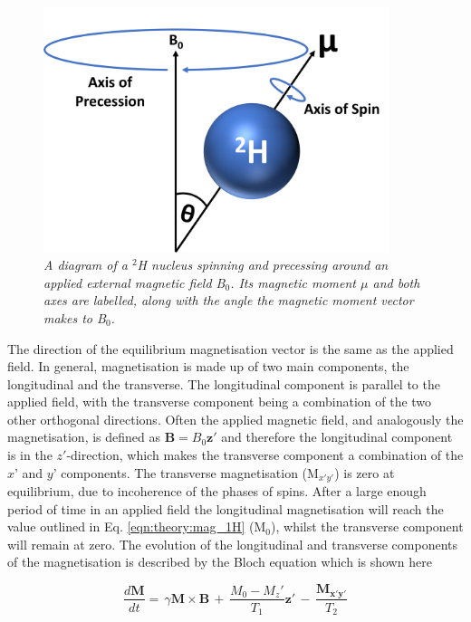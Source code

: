 \begin{figure}
    \centering
    \includegraphics[width=0.9\textwidth]{Figures/Theory/Moment.png}
    \caption{\textit{A diagram of a $^2$H nucleus spinning and precessing around an applied external magnetic field B$_0$. Its magnetic moment $\mu$ and both axes are labelled, along with the angle the magnetic moment vector makes to B$_0$.}}
    \label{fig:theory:moment}
\end{figure}

The direction of the equilibrium magnetisation vector is the same as the applied field. In general, magnetisation is made up of two main components, the longitudinal and the transverse. The longitudinal component is parallel to the applied field, with the transverse component being a combination of the two other orthogonal directions. Often the applied magnetic field, and analogously the magnetisation, is defined as $\mathbf{B}=B_0\mathbf{z'}$ and therefore the longitudinal component is in the $z'$-direction, which makes the transverse component a combination of the $x$' and $y$' components. The transverse magnetisation (M$_{x'y'}$) is zero at equilibrium, due to incoherence of the phases of spins. After a large enough period of time in an applied field the longitudinal magnetisation will reach the value outlined in Eq. \ref{eqn:theory:mag_1H} (M$_0$), whilst the transverse component will remain at zero. The evolution of the longitudinal and transverse components of the magnetisation is described by the Bloch equation \cite{Bloch1946NuclearInduction} which is shown here

\begin{equation}
    \frac{d\mathbf{M}}{dt} = \, \gamma\mathbf{M} \times \mathbf{B} \, + \, \frac{M_0-M_z'}{T_1}\mathbf{z'} \, - \, \frac{\mathbf{M_{x'y'}}}{T_2}
    \label{eqn:theory:Bloch}
\end{equation}

